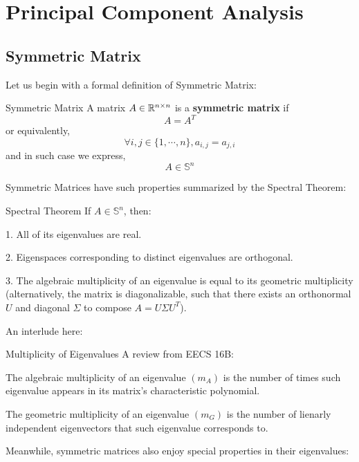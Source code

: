 \chapter{Principal Component Analysis}

\section{Symmetric Matrix}
Let us begin with a formal definition of Symmetric Matrix:
\begin{ln-define}{Symmetric Matrix}{}
    A matrix $A \in \mathbb{R}^{n \times n}$ is a \textbf{symmetric matrix} if
    \[A = A^T\]
    or equivalently,
    \[\forall i, j \in \{1, \cdots, n\}, a_{i,j} = a_{j,i}\]
    and in such case we express,
    \[A \in \mathbb{S}^n\]
\end{ln-define}
Symmetric Matrices have such properties summarized by the Spectral Theorem:
\begin{ln-theorem}{Spectral Theorem}{}
    If $A \in \mathbb{S}^n$, then:
    \begin{bindenum}
        \item[1.] All of its eigenvalues are real.
        \item[2.] Eigenspaces corresponding to distinct eigenvalues are orthogonal.
        \item[3.] The algebraic multiplicity of an eigenvalue is equal to its geometric multiplicity
        \subitem (alternatively, the matrix is diagonalizable, such that there exists an orthonormal $U$ and diagonal $\Sigma$ to compose $A = U \Sigma U^T$).
    \end{bindenum}
    An interlude here:
    \begin{ln-define}{Multiplicity of Eigenvalues}{}
        A review from EECS 16B:
        \begin{bindenum}
            \item The algebraic multiplicity of an eigenvalue $(m_A)$ is the number of times such eigenvalue appears in its matrix's characteristic polynomial.
            \item The geometric multiplicity of an eigenvalue $(m_G)$ is the number of lienarly independent eigenvectors that such eigenvalue corresponds to.
        \end{bindenum}
    \end{ln-define}
\end{ln-theorem}
Meanwhile, symmetric matrices also enjoy special properties in their eigenvalues:
